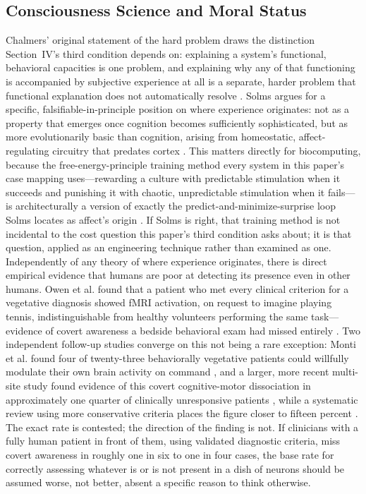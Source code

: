 \documentclass[journal]{IEEEtran}
\begin{document}
\subsection{\textcolor{tealcolor}{Consciousness Science and Moral Status}}

Chalmers' original statement of the hard problem draws the distinction Section~IV's
third condition depends on: explaining a system's functional, behavioral capacities
is one problem, and explaining why any of that functioning is accompanied by
subjective experience at all is a separate, harder problem that functional
explanation does not automatically resolve \cite{chalmers1995facing}. Solms argues
for a specific, falsifiable-in-principle position on where experience originates:
not as a property that emerges once cognition becomes sufficiently sophisticated, but
as more evolutionarily basic than cognition, arising from homeostatic,
affect-regulating circuitry that predates cortex \cite{solms2019hard}. This matters
directly for biocomputing, because the free-energy-principle training method every
system in this paper's case mapping uses---rewarding a culture with predictable
stimulation when it succeeds and punishing it with chaotic, unpredictable
stimulation when it fails---is architecturally a version of exactly the
predict-and-minimize-surprise loop Solms locates as affect's origin
\cite{kagan2022dishbrain}. If Solms is right, that training method is not incidental
to the cost question this paper's third condition asks about; it is that question,
applied as an engineering technique rather than examined as one. Independently of
any theory of where experience originates, there is direct empirical evidence that
humans are poor at detecting its presence even in other humans. Owen et al. found
that a patient who met every clinical criterion for a vegetative diagnosis showed
fMRI activation, on request to imagine playing tennis, indistinguishable from healthy
volunteers performing the same task---evidence of covert awareness a bedside
behavioral exam had missed entirely \cite{owen2006detecting}. Two independent
follow-up studies converge on this not being a rare exception: Monti et al. found
four of twenty-three behaviorally vegetative patients could willfully modulate their
own brain activity on command \cite{monti2010willful}, and a larger, more recent
multi-site study found evidence of this covert cognitive-motor dissociation in
approximately one quarter of clinically unresponsive patients
\cite{bodien2024cognitive}, while a systematic review using more conservative
criteria places the figure closer to fifteen percent \cite{kondziella2016systematic}.
The exact rate is contested; the direction of the finding is not. If clinicians with
a fully human patient in front of them, using validated diagnostic criteria, miss
covert awareness in roughly one in six to one in four cases, the base rate for
correctly assessing whatever is or is not present in a dish of neurons should be
assumed worse, not better, absent a specific reason to think otherwise.
\end{document}
